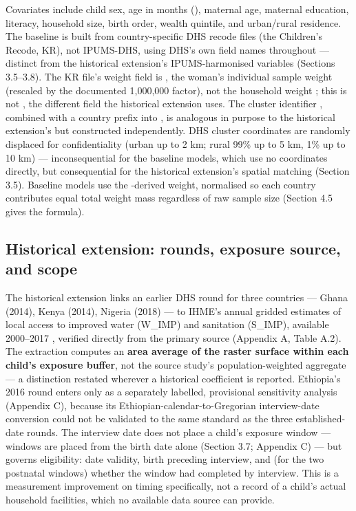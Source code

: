 Covariates include child sex, age in months (), maternal age, maternal education, literacy, household size, birth order, wealth quintile, and urban/rural residence. The baseline is built from country-specific DHS recode files (the Children's Recode, KR), not IPUMS-DHS, using DHS's own field names throughout --- distinct from the historical extension's IPUMS-harmonised variables (Sections 3.5--3.8). The KR file's weight field is , the woman's individual sample weight (rescaled by the documented 1,000,000 factor), not the household weight ; this is not , the different field the historical extension uses. The cluster identifier , combined with a country prefix into , is analogous in purpose to the historical extension's  but constructed independently. DHS cluster coordinates are randomly displaced for confidentiality (urban up to 2 km; rural 99\% up to 5 km, 1\% up to 10 km) \autocite{Burgert2013} --- inconsequential for the baseline models, which use no coordinates directly, but consequential for the historical extension's spatial matching (Section 3.5). Baseline models use the -derived weight, normalised so each country contributes equal total weight mass regardless of raw sample size (Section 4.5 gives the formula).

\subsection{Historical extension: rounds, exposure source, and scope}\label{sec:3.5}

The historical extension links an earlier DHS round for three countries --- Ghana (2014), Kenya (2014), Nigeria (2018) --- to IHME's annual gridded estimates of local access to improved water (W\_IMP) and sanitation (S\_IMP), available 2000--2017 \autocite{LBDWaSH2020}, verified directly from the primary source (Appendix A, Table A.2). The extraction computes an \textbf{area average of the raster surface within each child's exposure buffer}, not the source study's population-weighted aggregate --- a distinction restated wherever a historical coefficient is reported. Ethiopia's 2016 round enters only as a separately labelled, provisional sensitivity analysis (Appendix C), because its Ethiopian-calendar-to-Gregorian interview-date conversion could not be validated to the same standard as the three established-date rounds. The interview date does not place a child's exposure window --- windows are placed from the birth date alone (Section 3.7; Appendix C) --- but governs eligibility: date validity, birth preceding interview, and (for the two postnatal windows) whether the window had completed by interview. This is a measurement improvement on timing specifically, not a record of a child's actual household facilities, which no available data source can provide.

